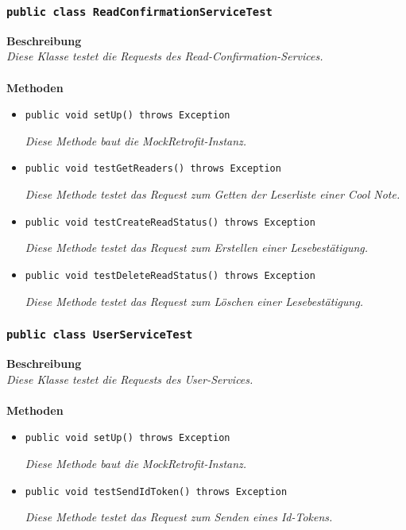 \documentclass[a4paper]{scrreprt}
\begin{document}
	\subsubsection{\texttt{public class ReadConfirmationServiceTest}}
	\textbf{Beschreibung}\\
	\textit{Diese Klasse testet die Requests des Read-Confirmation-Services.}\\
	\\
	\textbf{Methoden}
	\begin{itemize}
		
		
		\item\texttt{{public void setUp() throws Exception}}
		
		\textit{Diese Methode baut die MockRetrofit-Instanz.}
		
		\item\texttt{{public void testGetReaders() throws Exception}}
		
		\textit{Diese Methode testet das Request zum Getten der Leserliste einer Cool Note.}
		
		\item\texttt{{public void testCreateReadStatus() throws Exception}}
		
		\textit{Diese Methode testet das Request zum Erstellen einer Lesebestätigung.}
		
		\item\texttt{{public void testDeleteReadStatus() throws Exception}}
		
		\textit{Diese Methode testet das Request zum Löschen einer Lesebestätigung.}
		
	\end{itemize}

	\subsubsection{\texttt{public class UserServiceTest}}
	\textbf{Beschreibung}\\
	\textit{Diese Klasse testet die Requests des User-Services.}\\
	\\
	\textbf{Methoden}
	\begin{itemize}
				
		\item\texttt{{public void setUp() throws Exception}}
		
		\textit{Diese Methode baut die MockRetrofit-Instanz.}
		
		\item\texttt{{public void testSendIdToken() throws Exception}}
		
		\textit{Diese Methode testet das Request zum Senden eines Id-Tokens.}
		
	\end{itemize}
\end{document}
